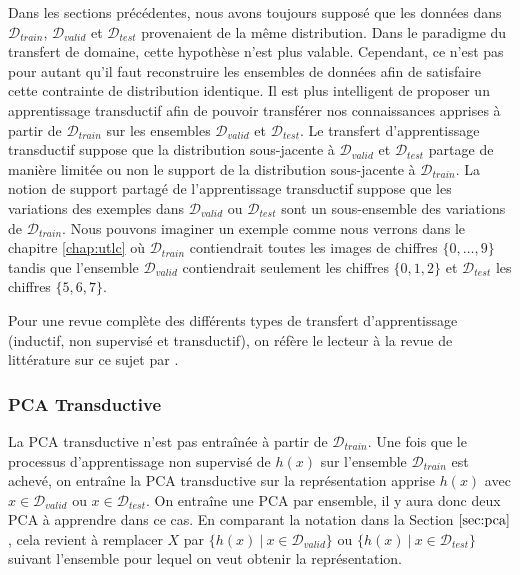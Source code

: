 Dans les sections précédentes, nous avons toujours supposé que les données dans
$\mathcal{D}_{train}$, $\mathcal{D}_{valid}$ et $\mathcal{D}_{test}$
provenaient de la même distribution. Dans le paradigme du transfert de domaine,
cette hypothèse n'est plus valable. Cependant, ce n'est pas pour autant qu'il
faut reconstruire les ensembles de données afin de satisfaire cette contrainte
de distribution identique. Il est plus intelligent de proposer un apprentissage
transductif afin de pouvoir transférer nos connaissances apprises à partir de
$\mathcal{D}_{train}$ sur les ensembles $\mathcal{D}_{valid}$ et
$\mathcal{D}_{test}$. Le transfert d'apprentissage transductif suppose que la
distribution sous-jacente à $\mathcal{D}_{valid}$ et $\mathcal{D}_{test}$
partage de manière limitée ou non le support de la distribution sous-jacente à
$\mathcal{D}_{train}$. La notion de support partagé de l'apprentissage
transductif suppose que les variations des exemples dans $\mathcal{D}_{valid}$
ou $\mathcal{D}_{test}$ sont un sous-ensemble des variations de
$\mathcal{D}_{train}$.  Nous pouvons imaginer un exemple comme nous verrons
dans le chapitre \ref{chap:utlc} où $\mathcal{D}_{train}$ contiendrait toutes
les images de chiffres $\lbrace 0,\dots,9 \rbrace$ tandis que l'ensemble
$\mathcal{D}_{valid}$ contiendrait seulement les chiffres $\lbrace 0,1,2
\rbrace$ et $\mathcal{D}_{test}$ les chiffres $\lbrace 5,6,7 \rbrace$.

Pour une revue complète des différents types de
transfert d'apprentissage (inductif, non supervisé et transductif), on réfère
le lecteur à la revue de littérature sur ce sujet par \citep{Pan-transfer}.

\subsubsection{PCA Transductive}

La PCA transductive n'est pas entraînée à partir de $\mathcal{D}_{train}$. Une
fois que le processus d'apprentissage non supervisé de $h(x)$ sur l'ensemble
$\mathcal{D}_{train}$ est achevé, on entraîne la PCA transductive sur la
représentation apprise $h(x)$ avec $x\in\mathcal{D}_{valid}$ ou
$x\in\mathcal{D}_{test}$. On entraîne une PCA par ensemble, il y aura donc deux
PCA à apprendre dans ce cas. En comparant la notation dans la Section $\ref{sec:pca}$, cela
revient à remplacer $X$ par $\lbrace h(x)~|~x\in\mathcal{D}_{valid}\rbrace$ ou
$\lbrace h(x)~|~x\in\mathcal{D}_{test}\rbrace$ suivant l'ensemble pour lequel
on veut obtenir la représentation.


